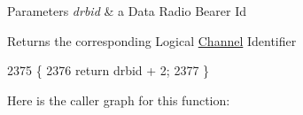 \begin{DoxyParams}{Parameters}
{\em drbid} & a Data Radio Bearer Id\\
\hline
\end{DoxyParams}
\begin{DoxyReturn}{Returns}
the corresponding Logical \hyperlink{classns3_1_1Channel}{Channel} Identifier 
\end{DoxyReturn}

\begin{DoxyCode}
2375 \{
2376   \textcolor{keywordflow}{return} drbid + 2;
2377 \}
\end{DoxyCode}


Here is the caller graph for this function\+:


